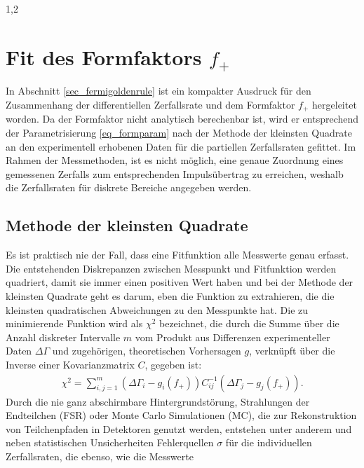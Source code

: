 \documentclass[11pt,a4paper,twoside]{report}
\begin{document}
\begin{spacing}{1,2}
\section{Fit des Formfaktors $f_+$}
In Abschnitt \ref{sec_fermigoldenrule} ist ein kompakter Ausdruck für den Zusammenhang der differentiellen Zerfallsrate und dem 
Formfaktor $f_+$ hergeleitet worden. Da der Formfaktor nicht analytisch berechenbar ist, wird er entsprechend der Parametrisierung \eqref{eq_formparam}
nach der Methode der kleinsten Quadrate an den experimentell erhobenen Daten für die partiellen Zerfallsraten gefittet. Im Rahmen der Messmethoden, ist es
nicht möglich, eine genaue Zuordnung eines gemessenen Zerfalls zum entsprechenden Impulsübertrag zu erreichen, weshalb die Zerfallsraten für diskrete Bereiche
angegeben werden. 

\subsection{Methode der kleinsten Quadrate}
Es ist praktisch nie der Fall, dass eine Fitfunktion alle Messwerte genau erfasst. Die entstehenden Diskrepanzen zwischen Messpunkt und Fitfunktion werden
quadriert, damit sie immer einen positiven Wert haben und bei der Methode der kleinsten Quadrate geht es darum, eben die Funktion zu extrahieren, die die 
kleinsten quadratischen Abweichungen zu den Messpunkte hat. Die zu minimierende Funktion wird als $\chi^2$ bezeichnet, die durch die Summe über die Anzahl diskreter 
Intervalle $m$ vom Produkt aus Differenzen experimenteller Daten $\Delta \Gamma$ und zugehörigen, theoretischen Vorhersagen $g$, verknüpft über die 
Inverse einer Kovarianzmatrix $C$, gegeben ist:
\begin{align}
 \chi^2 = \sum\limits_{i,j=1}^m (\Delta \Gamma_i - g_i(f_+))C^{-1}_{ij}(\Delta \Gamma_j - g_j(f_+)).
 \label{eq_chi2}
\end{align}
Durch die nie ganz abschirmbare Hintergrundstörung, Strahlungen der Endteilchen (FSR) oder Monte Carlo Simulationen (MC), die zur Rekonstruktion von 
Teilchenpfaden in Detektoren genutzt werden, entstehen unter anderem und neben statistischen Unsicherheiten Fehlerquellen $\sigma$ für die individuellen Zerfallsraten, die ebenso, wie die Messwerte 

\end{spacing}
\end{document}
